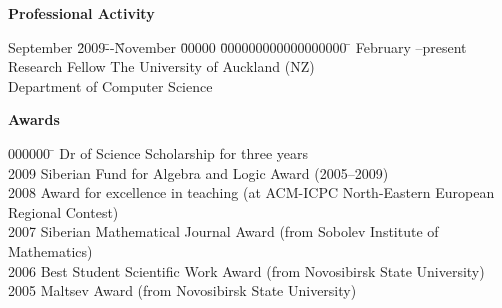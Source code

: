 \documentclass[12pt]{article}
\begin{document}
\centerline{\bf Professional Activity}
\begin{tabbing}
September	\=2009\=--\=November	\=00000	\= 000000000000000000		\= \kill
February	\>--\>present	\>	\> Research Fellow		\> The University of Auckland (NZ)\\
		\>    \>  \>		\>	\>				\> Department of Computer Science\\
\iftoggle{full}{
February	\>2015\>--\>present	\>	\> Affiliate			\> Fred Hutchinson Cancer Research Centre (US)\\
		\>    \>  \>		\>	\>				\> Computational Biology Programme\\
August		\>2013\>--\>July	\>2014	\> Lecturer	 		\> Auckland University of Technology (NZ)\\
		\>    \>  \>		\>	\>				\> School of Computer and Mathematical Sciences\\
November	\>2012\>--\>June	\>2013	\> Research Visitor		\> National University of Singapore\\
		\>    \>  \>		\>	\>				\> School of Computing\\
September	\>2009\>--\>December	\>2014	\> Senior Lecturer		\> Irkutsk State University (RF)\\
		\>    \>  \>		\>	\>				\> Institute of Mathematics and Computer Science\\
September	\>2009\>--\>November	\>2009	\> Research Visitor		\> University of Notre Dame (US)\\
		\>    \>  \>		\>	\>				\> Department of Mathematics\\
April		\>2009\>--\>August	\>2009	\> Research Assistant		\> Sobolev Institute of Mathematics (RF)\\
September	\>2006\>--\>July	\>2009	\> GTA				\> Novosibirsk State University (RF)\\
}{
September	\>2009\>--\>December	\>2014	\> Senior Lecturer		\> Irkutsk State University (RF)\\
		\>    \>  \>		\>	\>				\> Institute of Mathematics and Computer Science\\
}
\end{tabbing}

\centerline{\bf Awards}
\begin{tabbing}
000000	\=		\> Dr of Science Scholarship for three years\\
\iftoggle{full}{
	\> (This Award is a Russian analogue of New Zealand's Rutherford Discovery Fellowship)\\
}{}
2009	\> Siberian Fund for Algebra and Logic Award (2005--2009)\\
2008	\> Award for excellence in teaching (at ACM-ICPC North-Eastern European Regional Contest)\\
2007	\> Siberian Mathematical Journal Award (from Sobolev Institute of Mathematics)\\
2006	\> Best Student Scientific Work Award (from Novosibirsk State University)\\
2005	\> Maltsev Award (from Novosibirsk State University)\\
\end{tabbing}
\end{document}
